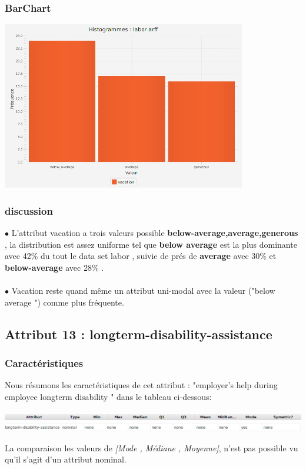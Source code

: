 \documentclass[12pt,a4paper,oneside]{book}
\begin{document}
	\subsubsection{BarChart}
	\begin{center}
		\includegraphics[width=0.8\textwidth]{screens/barchart/vacation-barchart.png}%
		\label{labelname}%
	\end{center}
	
	\subsubsection{discussion}
	$\bullet$ L'attribut vacation a trois valeurs possible \textbf{{below-average,average,generous}} , la distribution est assez uniforme  tel que  \textbf{below average} est la plus dominante avec  42\% du tout le data set labor , suivie de prés de \textbf{average} avec 30\% et \textbf{below-average} avec 28\% .\\
	\textbf{ }\\
	$\bullet$ Vacation reste quand même un attribut uni-modal avec la valeur ("below average ") comme plus fréquente.
	
	\newpage
	
	\subsection{Attribut 13 : longterm-disability-assistance }
	\subsubsection{Caractéristiques}
	Nous résumons les caractéristiques de cet attribut : "employer's help during employee longterm disability " dans le tableau ci-dessous:
	\begin{center}
		\includegraphics[width=1\textwidth]{screens/att.png}\\ \includegraphics[width=1\textwidth]{screens/att-14.png}%
		\label{labelname}%
	\end{center}
	La comparaison les valeurs de \textit{[Mode , Médiane , Moyenne]}, n'est pas possible vu qu'il s'agit d'un attribut nominal.
	
\end{document}
